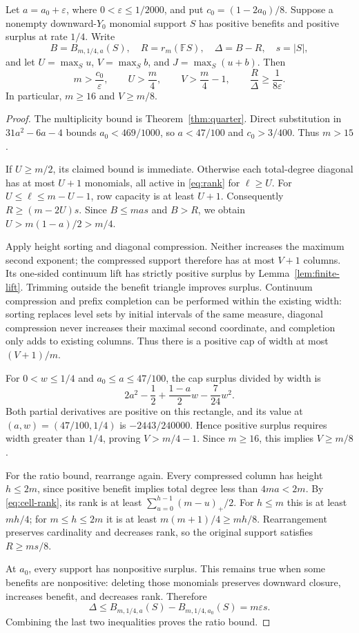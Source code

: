 \begin{theorem}\label{thm:gap-costs}
Let $a=a_0+\varepsilon$, where $0<\varepsilon\le1/2000$, and put
$c_0=(1-2a_0)/8$. Suppose a nonempty downward-$Y_0$ monomial support
$S$ has positive benefits and positive surplus at rate $1/4$. Write
\[
 B=B_{m,1/4,a}(S),\quad R=r_m(\mathbb F S),\quad
 \Delta=B-R,\quad s=|S|,
\]
and let $U=\max_S u$, $V=\max_S b$, and $J=\max_S(u+b)$. Then
\begin{equation}\label{eq:cost-lower}
 m>\frac{c_0}{\varepsilon},\qquad U>\frac m4,\qquad
 V>\frac m4-1,\qquad \frac R\Delta\ge\frac1{8\varepsilon}.
\end{equation}
In particular, $m\ge16$ and $V\ge m/8$.
\end{theorem}
\begin{proof}
The multiplicity bound is Theorem~\ref{thm:quarter}. Direct substitution
in $31a^2-6a-4$ bounds $a_0<469/1000$, so $a<47/100$ and
$c_0>3/400$. Thus $m>15$.

If $U\ge m/2$, its claimed bound is immediate. Otherwise each total-degree
diagonal has at most $U+1$ monomials, all active in \eqref{eq:rank} for
$\ell\ge U$. For $U\le\ell\le m-U-1$, row capacity is at least $U+1$.
Consequently $R\ge(m-2U)s$. Since $B\le mas$ and $B>R$, we obtain
$U>m(1-a)/2>m/4$.

Apply height sorting and diagonal compression. Neither increases the
maximum second exponent; the compressed support therefore has at most
$V+1$ columns. Its one-sided continuum lift has strictly positive
surplus by Lemma~\ref{lem:finite-lift}. Trimming outside the benefit
triangle improves surplus. Continuum compression and prefix completion
can be performed within the existing width: sorting replaces level sets
by initial intervals of the same measure, diagonal compression never
increases their maximal second coordinate, and completion only adds to
existing columns. Thus there is a positive cap of width at most
$(V+1)/m$.

For $0<w\le1/4$ and $a_0\le a\le47/100$, the cap surplus divided by
width is
\[
 2a^2-\frac12+\frac{1-a}{2}w-\frac7{24}w^2.
\]
Both partial derivatives are positive on this rectangle, and its value
at $(a,w)=(47/100,1/4)$ is $-2443/240000$. Hence positive surplus
requires width greater than $1/4$, proving $V>m/4-1$. Since $m\ge16$,
this implies $V\ge m/8$.

For the ratio bound, rearrange again. Every compressed column has height
$h\le2m$, since positive benefit implies total degree less than $4ma<2m$.
By \eqref{eq:cell-rank}, its rank is at least
$\sum_{u=0}^{h-1}(m-u)_+/2$. For $h\le m$ this is at least $mh/4$;
for $m\le h\le2m$ it is at least $m(m+1)/4\ge mh/8$.
Rearrangement preserves cardinality and decreases rank, so the original
support satisfies $R\ge ms/8$.

At $a_0$, every support has nonpositive surplus. This remains true
when some benefits are nonpositive: deleting those monomials preserves
downward closure, increases benefit, and decreases rank. Therefore
\[
 \Delta\le B_{m,1/4,a}(S)-B_{m,1/4,a_0}(S)
       =m\varepsilon s.
\]
Combining the last two inequalities proves the ratio bound.
\end{proof}

